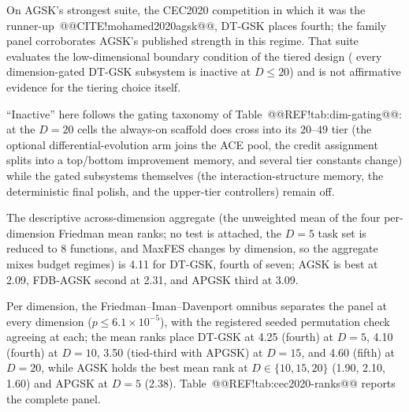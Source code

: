 \documentclass[10pt,a4paper]{article}
\newcommand{\dtgsk}{DT-GSK}
\newcommand{\agsk}{AGSK}
\newcommand{\apgsk}{APGSK}
\newcommand{\fdbagsk}{FDB-AGSK}
\begin{document}
On AGSK's strongest suite, the CEC2020 competition in which it was
the runner-up~@@CITE!mohamed2020agsk@@, \dtgsk{} places fourth; the family
panel corroborates AGSK's published strength in this regime.  That suite
evaluates the low-dimensional boundary condition of the tiered design (
every dimension-gated \dtgsk{} subsystem is inactive at $D \leq 20$)
and is not affirmative evidence for the tiering choice itself.

``Inactive'' here follows the gating taxonomy of
Table~@@REF!tab:dim-gating@@: at the $D = 20$ cells the always-on scaffold
does cross into its $20$--$49$ tier (the optional
differential-evolution arm joins the ACE pool, the credit assignment
splits into a top/bottom improvement memory, and several tier constants
change) while the gated subsystems themselves (the
interaction-structure memory, the deterministic final polish, and the
upper-tier controllers) remain off.

The descriptive across-dimension aggregate (the unweighted mean of the
four per-dimension Friedman mean ranks; no test is attached, the $D = 5$
task set is reduced to 8 functions, and MaxFES changes by dimension, so
the aggregate mixes budget regimes) is 4.11 for \dtgsk{}, fourth of
seven; \agsk{} is best at 2.09, \fdbagsk{} second at 2.31, and \apgsk{}
third at 3.09.

Per dimension, the Friedman--Iman--Davenport omnibus separates the panel
at every dimension ($p \leq 6.1 \times 10^{-5}$), with the registered
seeded permutation check agreeing at each; the mean ranks place \dtgsk{}
at 4.25 (fourth) at $D = 5$, 4.10 (fourth) at $D = 10$, 3.50 (tied-third
with \apgsk{}) at $D = 15$, and 4.60 (fifth) at $D = 20$, while \agsk{}
holds the best mean rank at $D \in \{10, 15, 20\}$ (1.90, 2.10, 1.60)
and \apgsk{} at $D = 5$ (2.38).
Table~@@REF!tab:cec2020-ranks@@ reports the complete panel.
\end{document}
